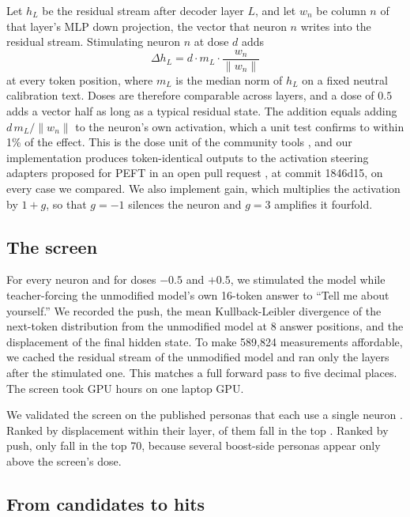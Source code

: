 \documentclass[11pt]{article}
\begin{document}
Let $h_L$ be the residual stream after decoder layer $L$, and let $w_n$ be column $n$ of that layer's MLP down
projection, the vector that neuron $n$ writes into the residual stream. Stimulating neuron $n$ at dose $d$ adds
\begin{equation}
\Delta h_L = d \cdot m_L \cdot \frac{w_n}{\lVert w_n \rVert}
\end{equation}
at every token position, where $m_L$ is the median norm of $h_L$ on a fixed neutral calibration text. Doses are
therefore comparable across layers, and a dose of $0.5$ adds a vector half as long as a typical residual state. The
addition equals adding $d\, m_L / \lVert w_n \rVert$ to the neuron's own activation, which a unit test confirms to
within 1\% of the effect. This is the dose unit of the community tools \citep{lyra2026explorer,peft4066}, and our
implementation produces token-identical outputs to the activation steering adapters proposed for PEFT in an open pull
request \citep{peft4066}, at commit 1846d15, on every case we compared. We also implement gain, which multiplies the activation by
$1 + g$, so that $g = -1$ silences the neuron and $g = 3$ amplifies it fourfold.

\subsection{The screen}
\label{sec:screen}

For every neuron and for doses $-0.5$ and $+0.5$, we stimulated the model while teacher-forcing the unmodified
model's own 16-token answer to ``Tell me about yourself.'' We recorded the push, the mean Kullback-Leibler
divergence of the next-token distribution from the unmodified model at 8 answer positions, and the displacement of
the final hidden state. To make 589,824 measurements affordable, we cached the residual stream of the unmodified
model and ran only the layers after the stimulated one. This matches a full forward pass to five decimal places. The
screen took \ScreenHours GPU hours on one laptop GPU.

We validated the screen on the \NStandalone published personas that each use a single neuron
\citep{lyra2026presets,lysandre2026linkedin,lysandre2026oracle,lysandre2026allcaps}. Ranked by
displacement within their layer, \RecallDisp of them fall in the top \PerLayer. Ranked by push, only \RecallKL fall
in the top 70, because several boost-side personas appear only above the screen's dose.

\subsection{From candidates to hits}
\label{sec:hits}
\end{document}
